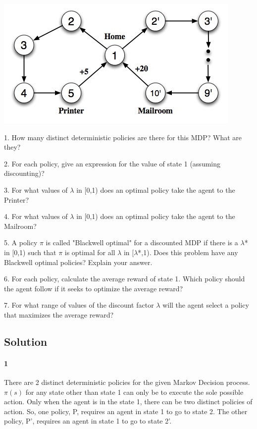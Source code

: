 \documentclass[10pt]{article}
\begin{document}
\begin{center}
 \includegraphics[scale=0.5]{hw6_files/domain.jpg}
\end{center}



1. How many distinct deterministic policies are there for this MDP? What are they?

2. For each policy, give an expression for the value of state 1 (assuming discounting)?

3. For what values of $\lambda$ in [0,1) does an optimal policy take the agent to the Printer?

4. For what values of $\lambda$ in [0,1) does an optimal policy take the agent to the Mailroom?

5. A policy $\pi$ is called "Blackwell optimal" for a discounted MDP if there is a $\lambda$* in [0,1) such that $\pi$ is optimal for all $\lambda$ in [$\lambda$*,1). Does this problem have any Blackwell optimal policies? Explain your answer.

6. For each policy, calculate the average reward of state 1. Which policy should the agent follow if it seeks to optimize the average reward?

7. For what range of values of the discount factor $\lambda$ will the agent select a policy that maximizes the average reward?

\subsection{Solution}

\paragraph{1} There are 2 distinct deterministic policies for the given Markov Decision process. $\pi(s)$ for any state other than state 1 can only be to execute the sole possible action. Only when the agent is in the state 1, there can be two distinct policies of action. So, one policy, P, requires an agent in state 1 to go to state 2. The other policy, P', requires an agent in state 1 to go to state 2'.
\end{document}
